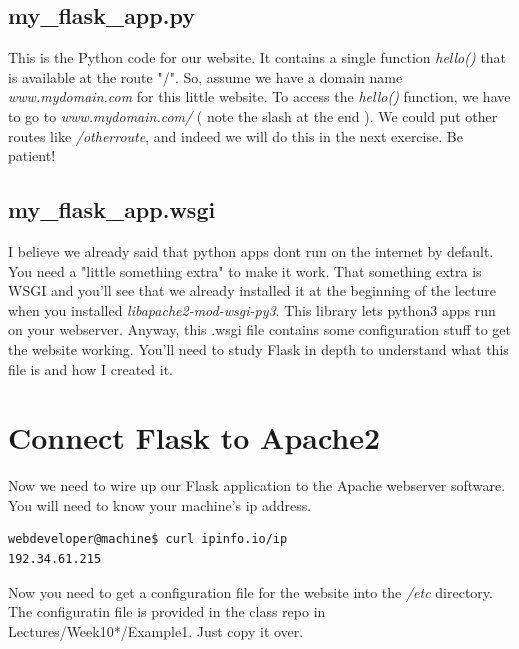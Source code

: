 \documentclass[10pt]{article}
\begin{document}
\subsection{my\_flask\_app.py}\label{sec:example1python}

This is the Python code for our website. It contains a single function
\textit{hello()} that is available at the route "/". So, assume we have a
domain name \textit{www.mydomain.com} for this little website. To access the
\textit{hello()} function, we have to go to \textit{www.mydomain.com/} ( note
the slash at the end ). We could put other routes like \textit{/otherroute}, and
indeed we will do this in the next exercise. Be patient!




\subsection{my\_flask\_app.wsgi}
\label{sec:example1wsgi}
I believe we already said that python apps dont run on the internet by default.
You need a "little something extra" to make it work. That something extra is
WSGI and you'll see that we already installed it at the beginning of the lecture
when you installed \textit{libapache2-mod-wsgi-py3}. This library lets python3
apps run on your webserver. Anyway, this .wsgi file contains some configuration
stuff to get the website working. You'll need to study Flask in depth to
understand what this file is and how I created it.




\section{Connect Flask to Apache2}
Now we need to wire up our Flask application to the Apache webserver software. You will need to know your machine's ip address.

\begin{lstlisting}[style=term, caption=Run this command to get your server's ip
address., label=lst:ip]
webdeveloper@machine$ curl ipinfo.io/ip
192.34.61.215
\end{lstlisting}

Now you need to get a configuration file for the website into the \textit{/etc}
directory. The configuratin file is provided in the class repo in
Lectures/Week10*/Example1. Just copy it over.
\end{document}
